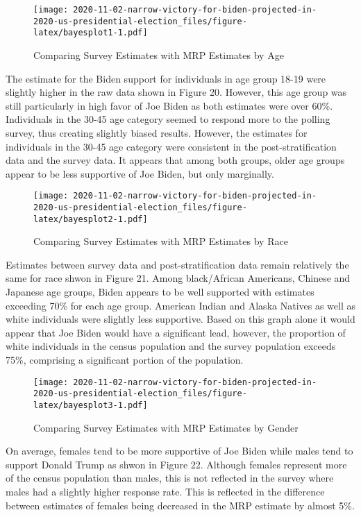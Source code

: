 \documentclass[
]{article}
\begin{document}
\begin{figure}
\centering
\texttt{[image: 2020-11-02-narrow-victory-for-biden-projected-in-2020-us-presidential-election\_files/figure-latex/bayesplot1-1.pdf]}
\caption{\label{fig:bayesplot1}Comparing Survey Estimates with MRP Estimates by Age}
\end{figure}

The estimate for the Biden support for individuals in age group 18-19 were slightly higher in the raw data shown in Figure 20. However, this age group was still particularly in high favor of Joe Biden as both estimates were over 60\%. Individuals in the 30-45 age category seemed to respond more to the polling survey, thus creating slightly biased results. However, the estimates for individuals in the 30-45 age category were consistent in the post-stratification data and the survey data. It appears that among both groups, older age groups appear to be less supportive of Joe Biden, but only marginally.

\begin{figure}
\centering
\texttt{[image: 2020-11-02-narrow-victory-for-biden-projected-in-2020-us-presidential-election\_files/figure-latex/bayesplot2-1.pdf]}
\caption{\label{fig:bayesplot2}Comparing Survey Estimates with MRP Estimates by Race}
\end{figure}

Estimates between survey data and post-stratification data remain relatively the same for race shwon in Figure 21. Among black/African Americans, Chinese and Japanese age groups, Biden appears to be well supported with estimates exceeding 70\% for each age group. American Indian and Alaska Natives as well as white individuals were slightly less supportive. Based on this graph alone it would appear that Joe Biden would have a significant lead, however, the proportion of white individuals in the census population and the survey population exceeds 75\%, comprising a significant portion of the population.

\begin{figure}
\centering
\texttt{[image: 2020-11-02-narrow-victory-for-biden-projected-in-2020-us-presidential-election\_files/figure-latex/bayesplot3-1.pdf]}
\caption{\label{fig:bayesplot3}Comparing Survey Estimates with MRP Estimates by Gender}
\end{figure}

On average, females tend to be more supportive of Joe Biden while males tend to support Donald Trump as shwon in Figure 22. Although females represent more of the census population than males, this is not reflected in the survey where males had a slightly higher response rate. This is reflected in the difference between estimates of females being decreased in the MRP estimate by almost 5\%.
\end{document}
